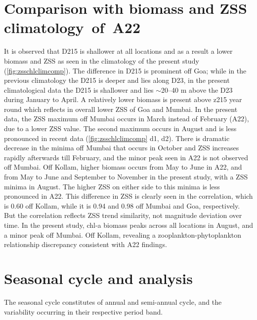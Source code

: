 \documentclass[authoryear,review,12pt]{elsarticle}
\begin{document}
	\section{Comparison with biomass and ZSS climatology~of~A22}	
	\label{sec:comparison} 	
	It is observed that D215 is shallower at all locations and as a result a lower biomass and ZSS as seen in the climatology of the present study (\cref{fig:zsschlclimcomp}). The difference in D215 is prominent off Goa; while in the previous climatology  the D215 is deeper and lies along D23, in the present climatological data the D215 is shallower and lies $\sim$20--40 m above the D23 during January to April. A relatively lower biomass is present above z215 year round which reflects in overall lower ZSS of Goa and Mumbai. In the present data, the ZSS maximum off Mumbai occurs in March instead of February (A22), due to a lower ZSS value. The second maximum occurs in August and is less pronounced in recent data (\cref{fig:zsschlclimcomp} d1, d2). There is dramatic decrease in the minima off Mumbai that occurs in October and ZSS increases rapidly afterwards till February, and the minor peak seen in A22 is not observed off Mumbai. Off Kollam, higher biomass occurs from May to June in A22, and from May to June and September to November in the present study, with a ZSS minima in August. The higher ZSS on either side to this minima is less pronounced in A22. This difference in ZSS is clearly seen in the correlation, which is 0.60 off Kollam, while it is 0.94 and 0.98 off Mumbai and Goa, respectively. But the correlation reflects ZSS trend similarity, not magnitude deviation over time. In the present study, chl-a biomass peaks across all locations in August, and a minor peak off Mumbai. Off Kollam, revealing a zooplankton-phytoplankton relationship discrepancy consistent with A22 findings.

	\section{Seasonal cycle and analysis}
	\label{sec:seasonlity_analysis}
	The seasonal cycle constitutes of annual and semi-annual cycle, and the variability occurring in their respective period band. 
\end{document}
